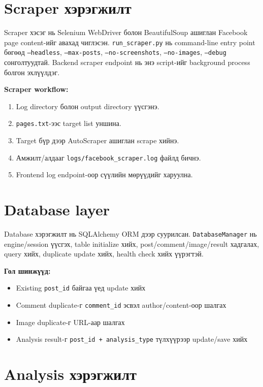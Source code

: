 \documentclass[
12pt,
oneside,
english,
onehalfspacing,
nolistspacing,
headsepline,
]{MUST-Thesis}
\begin{document}
\section{Scraper хэрэгжилт}

Scraper хэсэг нь Selenium WebDriver болон BeautifulSoup ашиглан Facebook page content-ийг авахад чиглэсэн. \texttt{run\_scraper.py} нь command-line entry point бөгөөд \texttt{--headless}, \texttt{--max-posts}, \texttt{--no-screenshots}, \texttt{--no-images}, \texttt{--debug} сонголтуудтай. Backend scraper endpoint нь энэ script-ийг background process болгон эхлүүлдэг.

\textbf{Scraper workflow:}
\begin{enumerate}
    \item Log directory болон output directory үүсгэнэ.
    \item \texttt{pages.txt}-ээс target list уншина.
    \item Target бүр дээр AutoScraper ашиглан scrape хийнэ.
    \item Амжилт/алдааг \texttt{logs/facebook\_scraper.log} файлд бичнэ.
    \item Frontend log endpoint-оор сүүлийн мөрүүдийг харуулна.
\end{enumerate}

\section{Database layer}

Database хэрэгжилт нь SQLAlchemy ORM дээр суурилсан. \texttt{DatabaseManager} нь engine/session үүсгэх, table initialize хийх, post/comment/image/result хадгалах, query хийх, duplicate update хийх, health check хийх үүрэгтэй.

\textbf{Гол шинжүүд:}
\begin{itemize}
    \item Existing \texttt{post\_id} байгаа үед update хийх
    \item Comment duplicate-г \texttt{comment\_id} эсвэл author/content-оор шалгах
    \item Image duplicate-г URL-аар шалгах
    \item Analysis result-г \texttt{post\_id + analysis\_type} түлхүүрээр update/save хийх
\end{itemize}

\section{Analysis хэрэгжилт}
\end{document}
